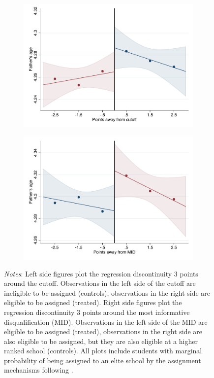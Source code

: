 \documentclass[oneside,11pt]{article}
\begin{document}
\begin{figure}[H]
\begin{center}
    \begin{subfigure}{0.475\textwidth}
        \centering
        \includegraphics[width=\textwidth]{04_Figures/rd_plot_tau_edad_pad_pdelta3.pdf}
    \end{subfigure}
    \begin{subfigure}{0.475\textwidth}
        \centering
        \includegraphics[width=\textwidth]{04_Figures/rd_plot_mid_edad_pad_pdelta3.pdf}
    \end{subfigure}
    \end{center}
    
\footnotesize
\textit{Notes}: Left side figures plot the regression discontinuity 3 points around the cutoff. Observations in the left side of the cutoff are ineligible to be assigned (controls), observations in the right side are eligible to be assigned (treated). Right side figures plot the regression discontinuity 3 points around the most informative disqualification (MID). Observations in the left side of the MID are eligible to be assigned (treated), observations in the right side are also eligible to be assigned, but they are also eligible at a higher ranked school (controls). All plots include students with marginal probability of being assigned to an elite school by the assignment mechanisms following \citet{abdulkadirouglu2022breaking}. 
\end{figure}
\end{document}
